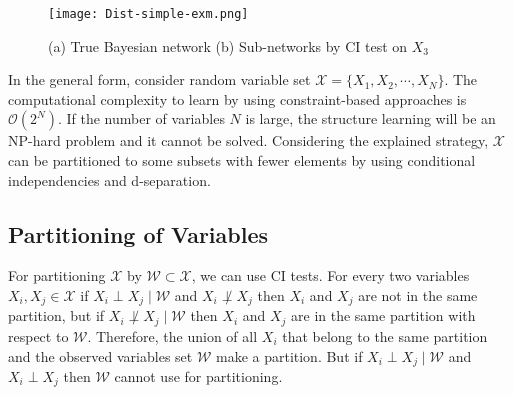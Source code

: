 \documentclass{article}
\newcommand{\X}{\mathcal{X}}
\newcommand{\W}{\mathcal{W}}
\begin{document}
\begin{figure}[!ht]
    \centering
    \texttt{[image: Dist-simple-exm.png]}
    \caption{(a) True Bayesian network (b) Sub-networks by CI test on $X_3$}
    \label{f-simple}
\end{figure}


In the general form, consider random variable set $\X = \{X_1, X_2,\cdots, X_N \}$. The computational complexity to learn by using constraint-based  approaches is $\mathcal{O}(2^N)$.  If the number of variables $N$ is large, the structure learning will be an NP-hard problem and it cannot be solved. 
Considering the explained strategy, $\X$ can be partitioned to some subsets with fewer elements by using conditional independencies  and d-separation. 

\subsection{Partitioning of Variables}
For partitioning $\X$ by $\W \subset \X$, we can use CI tests. For every two variables $X_i,X_j \in \X$ if $X_i\perp X_j \mid \W$ and $X_i\not\perp X_j$ then $X_i$ and $X_j$ are not in the same partition, but if $X_i\not \perp X_j \mid \W$ then $X_i$ and $X_j$ are in the same partition with respect to $\W$.
Therefore, the union of all $X_i$ that belong to the same partition and the observed variables set $\W$ make a partition. 
But if $X_i\perp X_j \mid \W$ and $X_i\perp X_j$ then $\W$ cannot use for partitioning.
\end{document}
